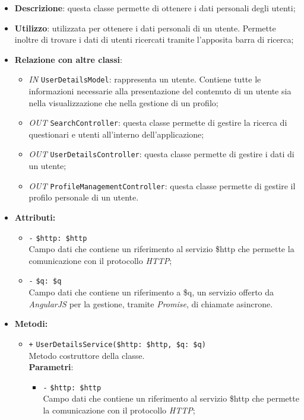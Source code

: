 \begin{itemize}
	\item \textbf{Descrizione}: questa classe permette di ottenere i dati personali degli utenti;
	\item \textbf{Utilizzo}: utilizzata per ottenere i dati personali di un utente. Permette inoltre di trovare i dati di utenti ricercati tramite l'apposita barra di ricerca;
	\item \textbf{Relazione con altre classi}:
	\begin{itemize}
		\item \textit{IN} \texttt{UserDetailsModel}: rappresenta un utente. Contiene tutte le informazioni necessarie alla
		presentazione del contenuto di un utente sia nella visualizzazione che nella gestione di un profilo; 
		\item \textit{OUT} \texttt{SearchController}: questa classe permette di gestire la ricerca di questionari e utenti all'interno dell'applicazione;
		\item \textit{OUT} \texttt{UserDetailsController}: questa classe permette di gestire i dati di un utente;
		\item \textit{OUT} \texttt{ProfileManagementController}: questa classe permette di gestire il profilo personale di un utente. 
	\end{itemize}
	\item \textbf{Attributi:}
	\begin{itemize}
		\item \texttt{-} \texttt{\$http: \$http} \\ Campo dati che contiene un riferimento al servizio \$http che permette la comunicazione con il protocollo \textit{HTTP};
		\item \texttt{-} \texttt{\$q: \$q} \\ Campo dati che contiene un riferimento a \$q, un servizio offerto da \textit{AngularJS} per la gestione, tramite \textit{Promise}, di chiamate asincrone.
	\end{itemize}
	\item \textbf{Metodi:}
	\begin{itemize}
		\item \texttt{+} \texttt{UserDetailsService(\$http: \$http, \$q: \$q)} \\ Metodo costruttore della classe. \\
		\textbf{Parametri}:
		\begin{itemize}
			\item \texttt{-} \texttt{\$http: \$http} \\ Campo dati che contiene un riferimento al servizio \$http che permette la comunicazione con il protocollo \textit{HTTP};

\end{itemize}
\end{itemize}
\end{itemize}
